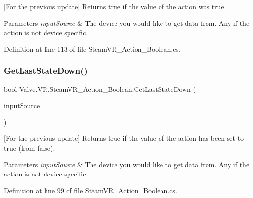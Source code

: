 \mbox{[}For the previous update\mbox{]} Returns true if the value of the action was true. 


\begin{DoxyParams}{Parameters}
{\em input\+Source} & The device you would like to get data from. Any if the action is not device specific.\\
\hline
\end{DoxyParams}


Definition at line 113 of file Steam\+V\+R\+\_\+\+Action\+\_\+\+Boolean.\+cs.

\mbox{\label{class_valve_1_1_v_r_1_1_steam_v_r___action___boolean_a3e90d2e15de3161ebb4a81a2359d107b}} 
\subsubsection{\texorpdfstring{GetLastStateDown()}{GetLastStateDown()}}
{\footnotesize\ttfamily bool Valve.\+V\+R.\+Steam\+V\+R\+\_\+\+Action\+\_\+\+Boolean.\+Get\+Last\+State\+Down (\begin{DoxyParamCaption}\item[{\mbox{\hyperlink{namespace_valve_1_1_v_r_a82e5bf501cc3aa155444ee3f0662853f}{Steam\+V\+R\+\_\+\+Input\+\_\+\+Sources}}}]{input\+Source }\end{DoxyParamCaption})}



\mbox{[}For the previous update\mbox{]} Returns true if the value of the action has been set to true (from false). 


\begin{DoxyParams}{Parameters}
{\em input\+Source} & The device you would like to get data from. Any if the action is not device specific.\\
\hline
\end{DoxyParams}


Definition at line 99 of file Steam\+V\+R\+\_\+\+Action\+\_\+\+Boolean.\+cs.

\mbox{\label{class_valve_1_1_v_r_1_1_steam_v_r___action___boolean_aaa7751d7c25465162535140bba43e5a2}} 
